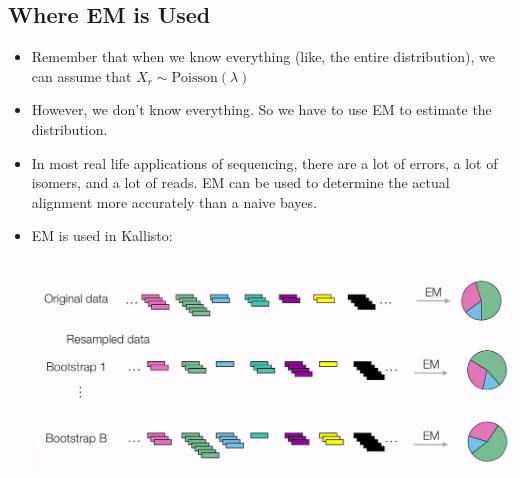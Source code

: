\documentclass[10pt]{article}
\begin{document}
\subsection*{Where EM is Used}
\begin{itemize}
    \item Remember that when we know everything (like, the entire distribution), we can assume that $X_r \sim \text{Poisson}(\lambda)$
    \item However, we don't know everything.  So we have to use EM to estimate the distribution.
    \item In most real life applications of sequencing, there are a lot of errors, a lot of isomers, and a lot of reads.  EM can be used to determine the actual alignment more accurately than a naive bayes.
    \item EM is used in Kallisto:
    \begin{center}
        \includegraphics*[scale=0.5]{W6_1.png}
    \end{center}
\end{itemize}
\end{document}
